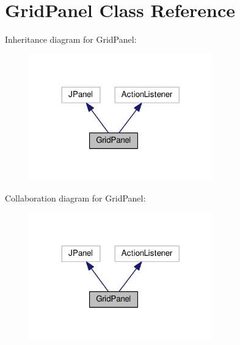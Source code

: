 \hypertarget{classGridPanel}{}\section{Grid\+Panel Class Reference}
\label{classGridPanel}


Inheritance diagram for Grid\+Panel\+:
\nopagebreak
\begin{figure}[H]
\begin{center}
\leavevmode
\includegraphics[width=224pt]{classGridPanel__inherit__graph}
\end{center}
\end{figure}


Collaboration diagram for Grid\+Panel\+:
\nopagebreak
\begin{figure}[H]
\begin{center}
\leavevmode
\includegraphics[width=224pt]{classGridPanel__coll__graph}
\end{center}
\end{figure}

